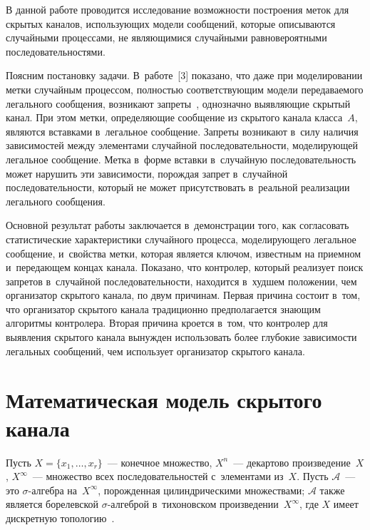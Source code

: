 \begin{multicols}{2}
  В данной работе проводится исследование возможности построения меток
для скрытых каналов, использующих модели сообщений, которые описываются
случайными процессами, не являющимися случайными равновероятными
последовательностями.

  Поясним постановку задачи. В~работе~[3] показано, что даже при
моделировании метки случайным процессом, полностью соответствующим
модели передаваемого легального сообщения, возникают запреты~\cite{4-gr, 5-gr},
однозначно выявляющие скрытый канал. При этом метки, определяющие
сообщение из скрытого канала класса~$A$, являются вставками в~легальное
сообщение. Запреты возникают в~силу наличия зависимостей между
элементами случайной последовательности, моделирующей легальное
сообщение. Метка в~форме вставки в~случайную последовательность может
нарушить эти зависимости, порождая запрет в~случайной последовательности,
который не может присутствовать в~реальной реализации легального
сообщения.

  Основной результат работы заключается в~демонстрации того, как
согласовать статистические характеристики случайного процесса,
мо\-де\-ли\-ру\-юще\-го легальное сообщение, и~свойства метки, которая является
ключом, известным на приемном и~передающем концах канала. Показано, что
контролер, который реализует поиск запретов в~случайной последовательности,
находится в~худшем положении, чем организатор скрытого канала, по
двум причинам. Первая причина состоит в~том, что организатор скрытого
канала традиционно предполагается знающим алгоритмы контролера. Вторая
причина кроется в~том, что контролер для выявления скрытого канала
вынужден использовать более глубокие зависимости легальных сообщений, чем
использует организатор скрытого канала.


\section{Математическая модель скрытого канала}

  Пусть $X=\{x_1, \ldots ,x_r\}$~--- конечное множество, $X^n$~--- декартово
произведение~$X$,  $X^\infty$~--- множество всех последовательностей
с~элементами из~$X$. Пусть $\mathcal{A}$~--- это $\sigma$-ал\-геб\-ра
на~$X^\infty$, порожденная цилиндрическими множествами; $\mathcal{A}$
также является борелевской $\sigma$-ал\-геб\-рой в~тихоновском
произведении~$X^\infty$, где $X$ имеет дискретную топологию~\cite{6-gr, 7-gr}.


\end{multicols}
